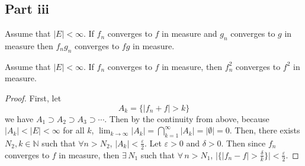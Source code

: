 \subsection{Part iii}

\begin{question}
   Assume that $|E|<\infty$. If $f_n$ converges to $f$ in measure and $g_n$ converges to $g$ in measure then $f_n g_n$ converges to $f g$ in measure.
\end{question}

\begin{answer}
    \begin{prop}\label{prop:prop1}
        Assume that $\lvert E \rvert < \infty$. If $f_n$ converges to $f$ in measure, then $f_n^2$ converges to $f^2$ in measure.
    \end{prop}
    
    \begin{proof}
         First, let
        \begin{equation}
            A_k = \{\lvert f_n + f \rvert > k\}
        \end{equation}
        we have $A_1 \supset A_2 \supset A_3 \supset \cdots$. Then by the continuity from above, because $\lvert A_k \rvert < \lvert E \rvert < \infty$ for all $k$, $\lim_{k \to \infty} \lvert A_k \rvert = \bigcap_{k = 1}^{\infty} \lvert A_k \rvert = \lvert \emptyset \rvert = 0$. Then, there exists $N_2, k \in \mathbb{N}$ such that $\forall n > N_2$, $\lvert A_k \rvert < \tfrac{\varepsilon}{2}$. Let $\varepsilon > 0$ and $\delta > 0$. Then since $f_n$ converges to $f$ in measure, then $\exists \, N_1$ such that $\forall \, n > N_1$, $\lvert \{\lvert f_{n} - f \rvert > \tfrac{\delta}{k}\}\rvert < \tfrac{\varepsilon}{2}$.
        

\end{proof}
\end{answer}
